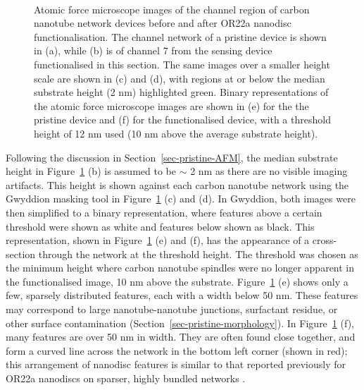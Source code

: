\documentclass[
  a4paper,
]{scrbook}
\begin{document}
\begin{figure}
\begin{minipage}[t]{0.01\linewidth}
{\centering 

~

}

\end{minipage}%

\caption[Atomic force microscope images of the channel region of carbon
nanotube network devices before and after successful OR22a nanodisc
functionalisation, with substrate and nanodisc heights indicated using
masking and binary representations.]{\label{fig-working-OR22a-AFM}Atomic
force microscope images of the channel region of carbon nanotube network
devices before and after OR22a nanodisc functionalisation. The channel
network of a pristine device is shown in (a), while (b) is of channel 7
from the sensing device functionalised in this section. The same images
over a smaller height scale are shown in (c) and (d), with regions at or
below the median substrate height (2 nm) highlighted green. Binary
representations of the atomic force microscope images are shown in (e)
for the the pristine device and (f) for the functionalised device, with
a threshold height of 12 nm used (10 nm above the average substrate
height).}

\end{figure}

Following the discussion in Section~\ref{sec-pristine-AFM}, the median
substrate height in Figure~\ref{fig-working-OR22a-AFM} (b) is assumed to
be \(\sim\) 2 nm as there are no visible imaging artifacts. This height
is shown against each carbon nanotube network using the Gwyddion masking
tool in Figure~\ref{fig-working-OR22a-AFM} (c) and (d). In Gwyddion,
both images were then simplified to a binary representation, where
features above a certain threshold were shown as white and features
below shown as black. This representation, shown in
Figure~\ref{fig-working-OR22a-AFM} (e) and (f), has the appearance of a
cross-section through the network at the threshold height. The threshold
was chosen as the minimum height where carbon nanotube spindles were no
longer apparent in the functionalised image, 10 nm above the substrate.
Figure~\ref{fig-working-OR22a-AFM} (e) shows only a few, sparsely
distributed features, each with a width below 50 nm. These features may
correspond to large nanotube-nanotube junctions, surfactant residue, or
other surface contamination (Section~\ref{sec-pristine-morphology}). In
Figure~\ref{fig-working-OR22a-AFM} (f), many features are over 50 nm in
width. They are often found close together, and form a curved line
across the network in the bottom left corner (shown in red); this
arrangement of nanodisc features is similar to that reported previously
for OR22a nanodiscs on sparser, highly bundled networks
\autocite{Murugathas2019a}.
\end{document}
